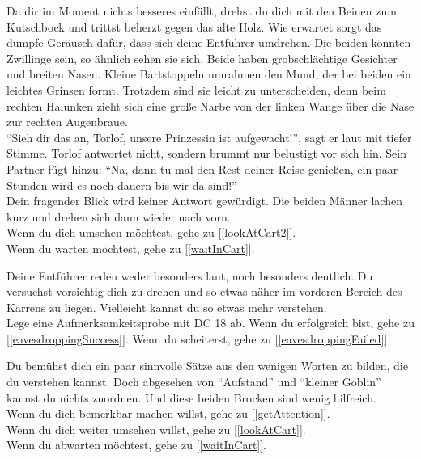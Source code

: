 Da dir im Moment nichts besseres einfällt, drehst du dich mit den Beinen zum Kutschbock und trittst beherzt gegen das alte Holz. Wie erwartet sorgt das dumpfe Geräusch dafür, dass sich deine Entführer umdrehen. Die beiden könnten Zwillinge sein, so ähnlich sehen sie sich. Beide haben grobschlächtige Gesichter und breiten Nasen. Kleine Bartstoppeln umrahmen den Mund, der bei beiden ein leichtes Grinsen formt. Trotzdem sind sie leicht zu unterscheiden, denn beim rechten Halunken zieht sich eine große Narbe von der linken Wange über die Nase zur rechten Augenbraue.\\
``Sieh dir das an, Torlof, unsere Prinzessin ist aufgewacht!'', sagt er laut mit tiefer Stimme. Torlof antwortet nicht, sondern brummt nur belustigt vor sich hin. Sein Partner fügt hinzu: ``Na, dann tu mal den Rest deiner Reise genießen, ein paar Stunden wird es noch dauern bis wir da sind!''\\
Dein fragender Blick wird keiner Antwort gewürdigt. Die beiden Männer lachen kurz und drehen sich dann wieder nach vorn.
\\Wenn du dich umsehen möchtest, gehe zu [\ref{lookAtCart2}].
\\Wenn du warten möchtest, gehe zu [\ref{waitInCart}].


Deine Entführer reden weder besonders laut, noch besonders deutlich. Du versuchst vorsichtig dich zu drehen und so etwas näher im vorderen Bereich des Karrens zu liegen. Vielleicht kannst du so etwas mehr verstehen.
\\Lege eine Aufmerksamkeitsprobe mit DC 18 ab. Wenn du erfolgreich bist, gehe zu [\ref{eavesdroppingSuccess}].
Wenn du scheiterst, gehe zu [\ref{eavesdroppingFailed}].


Du bemühst dich ein paar sinnvolle Sätze aus den wenigen Worten zu bilden, die du verstehen kannst. Doch abgesehen von ``Aufstand'' und ``kleiner Goblin'' kannst du nichts zuordnen. Und diese beiden Brocken sind wenig hilfreich.
\\Wenn du dich bemerkbar machen willst, gehe zu [\ref{getAttention}].
\\Wenn du dich weiter umsehen willst, gehe zu [\ref{lookAtCart}].
\\Wenn du abwarten möchtest, gehe zu [\ref{waitInCart}].


